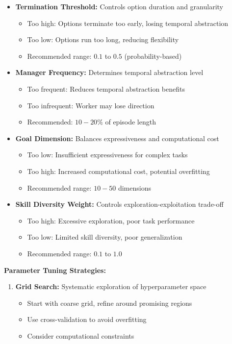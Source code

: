 \documentclass[12pt]{article}
\begin{document}
{{\begin{itemize}
    \item \textbf{Termination Threshold:} Controls option duration and granularity
    \begin{itemize}
        \item Too high: Options terminate too early, losing temporal abstraction
        \item Too low: Options run too long, reducing flexibility
        \item Recommended range: $0.1$ to $0.5$ (probability-based)
    \end{itemize}
    
    \item \textbf{Manager Frequency:} Determines temporal abstraction level
    \begin{itemize}
        \item Too frequent: Reduces temporal abstraction benefits
        \item Too infrequent: Worker may lose direction
        \item Recommended: $10-20\%$ of episode length
    \end{itemize}
    
    \item \textbf{Goal Dimension:} Balances expressiveness and computational cost
    \begin{itemize}
        \item Too low: Insufficient expressiveness for complex tasks
        \item Too high: Increased computational cost, potential overfitting
        \item Recommended range: $10-50$ dimensions
    \end{itemize}
    
    \item \textbf{Skill Diversity Weight:} Controls exploration-exploitation trade-off
    \begin{itemize}
        \item Too high: Excessive exploration, poor task performance
        \item Too low: Limited skill diversity, poor generalization
        \item Recommended range: $0.1$ to $1.0$
    \end{itemize}
\end{itemize}

\textbf{Parameter Tuning Strategies:}
\begin{enumerate}
    \item \textbf{Grid Search:} Systematic exploration of hyperparameter space
    \begin{itemize}
        \item Start with coarse grid, refine around promising regions
        \item Use cross-validation to avoid overfitting
        \item Consider computational constraints
    \end{itemize}
    

\end{enumerate}}}
\end{document}

